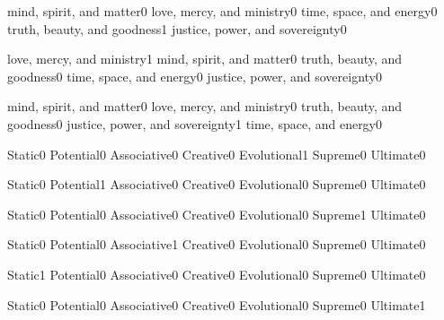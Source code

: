 \quizheader
{}


  {mind, spirit, and matter}{0}
  {love, mercy, and ministry}{0}
  {time, space, and energy}{0}
  {truth, beauty, and goodness}{1}
  {justice, power, and sovereignty}{0}
\qstop

  {love, mercy, and ministry}{1}
  {mind, spirit, and matter}{0}
  {truth, beauty, and goodness}{0}
  {time, space, and energy}{0}
  {justice, power, and sovereignty}{0}
\qstop

  {mind, spirit, and matter}{0}
  {love, mercy, and ministry}{0}
  {truth, beauty, and goodness}{0}
  {justice, power, and sovereignty}{1}
  {time, space, and energy}{0}
\qstop

  {Static}{0}
  {Potential}{0}
  {Associative}{0}
  {Creative}{0}
  {Evolutional}{1}
  {Supreme}{0}
  {Ultimate}{0}
\qstop

  {Static}{0}
  {Potential}{1}
  {Associative}{0}
  {Creative}{0}
  {Evolutional}{0}
  {Supreme}{0}
  {Ultimate}{0}
\qstop

  {Static}{0}
  {Potential}{0}
  {Associative}{0}
  {Creative}{0}
  {Evolutional}{0}
  {Supreme}{1}
  {Ultimate}{0}
\qstop

  {Static}{0}
  {Potential}{0}
  {Associative}{1}
  {Creative}{0}
  {Evolutional}{0}
  {Supreme}{0}
  {Ultimate}{0}
\qstop

  {Static}{1}
  {Potential}{0}
  {Associative}{0}
  {Creative}{0}
  {Evolutional}{0}
  {Supreme}{0}
  {Ultimate}{0}
\qstop

  {Static}{0}
  {Potential}{0}
  {Associative}{0}
  {Creative}{0}
  {Evolutional}{0}
  {Supreme}{0}
  {Ultimate}{1}
\qstop

